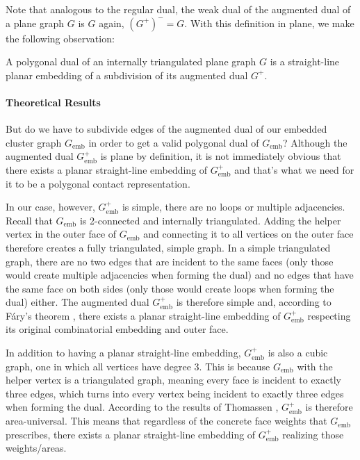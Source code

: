Note that analogous to the regular dual, the weak dual of the augmented dual of a plane graph $G$ is $G$ again, \ie{} $(G^+)^- = G$.
With this definition in plane, we make the following observation:

\begin{corollary}
	A polygonal dual of an internally triangulated plane graph $G$ is a straight-line planar embedding of a subdivision of its augmented dual $G^+$.
\end{corollary}



\paragraph{Theoretical Results}

But do we have to subdivide edges of the augmented dual of our embedded cluster graph $G_\text{emb}$ in order to get a valid polygonal dual of $G_\text{emb}$?
Although the augmented dual $G_\text{emb}^+$ is plane by definition, it is not immediately obvious that there exists a planar straight-line embedding of $G_\text{emb}^+$ \emdash{} and that's what we need for it to be a polygonal contact representation.

In our case, however, $G_\text{emb}^+$ is simple, \ie{} there are no loops or multiple adjacencies.
Recall that $G_\text{emb}$ is 2-connected and internally triangulated.
Adding the helper vertex in the outer face of $G_\text{emb}$ and connecting it to all vertices on the outer face therefore creates a fully triangulated, simple graph.
In a simple triangulated graph, there are no two edges that are incident to the same faces (only those would create multiple adjacencies when forming the dual) and no edges that have the same face on both sides (only those would create loops when forming the dual) either.
The augmented dual $G_\text{emb}^+$ is therefore simple and, according to Fáry's theorem \cite{fary1948straight}, there exists a planar straight-line embedding of $G_\text{emb}^+$ respecting its original combinatorial embedding and outer face.

In addition to having a planar straight-line embedding, $G_\text{emb}^+$ is also a cubic graph, \ie{} one in which all vertices have degree 3.
This is because $G_\text{emb}$ with the helper vertex is a triangulated graph, meaning every face is incident to exactly three edges, which turns into every vertex being incident to exactly three edges when forming the dual.
According to the results of Thomassen \cite{thomassen1992plane}, $G_\text{emb}^+$ is therefore area-universal.
This means that regardless of the concrete face weights that $G_\text{emb}$ prescribes, there exists a planar straight-line embedding of $G_\text{emb}^+$ realizing those weights/areas.

